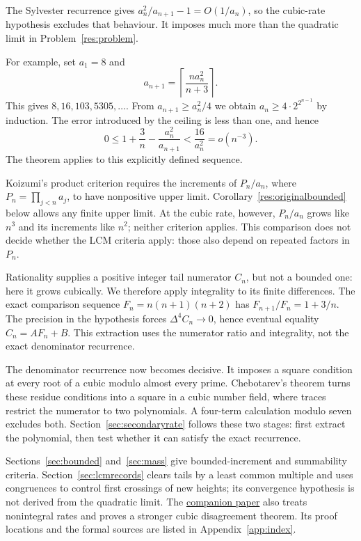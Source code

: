 \documentclass[11pt]{article}
\begin{document}
The Sylvester recurrence gives $a_n^2/a_{n+1}-1=O(1/a_n)$, so the
cubic-rate hypothesis excludes that behaviour. It imposes much more
than the quadratic limit in Problem~\ref{res:problem}.

For example, set $a_1=8$ and
\[
 a_{n+1}=\left\lceil\frac{n a_n^2}{n+3}\right\rceil.
\]
This gives $8,16,103,5305,\ldots$. From $a_{n+1}\ge a_n^2/4$ we
obtain $a_n\ge4\cdot2^{2^{n-1}}$ by induction. The error introduced
by the ceiling is less than one, and hence
\[
 0\le 1+\frac3n-\frac{a_n^2}{a_{n+1}}<\frac{16}{a_n^2}=o(n^{-3}).
\]
The theorem applies to this explicitly defined sequence.

Koizumi's product criterion \cite[Corollary~4]{koizumi2025} requires
the increments of $P_n/a_n$, where $P_n=\prod_{j<n}a_j$, to have
nonpositive upper limit. Corollary~\ref{res:originalbounded} below allows
any finite upper limit. At the cubic rate, however, $P_n/a_n$ grows
like $n^3$ and its increments like $n^2$; neither criterion applies.
This comparison does not decide whether the LCM criteria apply: those
also depend on repeated factors in $P_n$.

Rationality supplies a positive integer tail numerator $C_n$, but not
a bounded one: here it grows cubically. We therefore apply integrality
to its finite differences. The exact comparison sequence
$F_n=n(n+1)(n+2)$ has $F_{n+1}/F_n=1+3/n$. The precision in the
hypothesis forces $\Delta^4C_n\to0$, hence eventual equality
$C_n=AF_n+B$. This extraction uses the numerator ratio and integrality, not the
exact denominator recurrence.

The denominator recurrence now becomes decisive. It imposes a square
condition at every root of a cubic modulo almost every prime.
Chebotarev's theorem turns these residue conditions into a square in a
cubic number field, where traces restrict the numerator to two
polynomials. A four-term calculation modulo seven excludes both.
Section~\ref{sec:secondaryrate} follows these two stages: first extract
the polynomial, then test whether it can satisfy the exact recurrence.

Sections~\ref{sec:bounded} and~\ref{sec:mass} give bounded-increment
and summability criteria. Section~\ref{sec:lcmrecords} clears tails by
a least common multiple and uses congruences to control first crossings
of new heights; its convergence hypothesis is not derived from the
quadratic limit. The
\href{erdos243-reciprocal-tail-reasoning-surface.pdf}{companion paper}
also treats nonintegral rates and proves a stronger cubic disagreement
theorem. Its proof locations and the formal sources are listed in
Appendix~\ref{app:index}.
\end{document}
